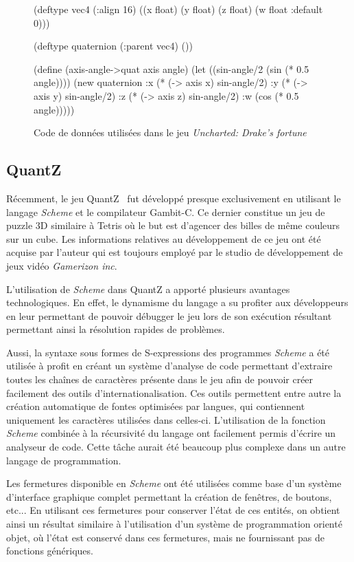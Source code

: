 \documentclass[12pt,twoside,letterpaper,francais]{book}
\newcommand{\Schemelang}{{\textit{Scheme }}}
\newcommand{\scheme}[1]{\selectlanguage{english}{\tt #1}\selectlanguage{french}}
\begin{document}
\begin{figure}[htb!]
  \begin{schemecode}
(deftype vec4 (:align 16)
  ((x float) (y float)
   (z float) (w float :default 0)))

(deftype quaternion (:parent vec4) ())

(define (axis-angle->quat axis angle)
 (let ((sin-angle/2 (sin (* 0.5 angle))))
  (new quaternion
       :x (* (-> axis x) sin-angle/2)
       :y (* (-> axis y) sin-angle/2)
       :z (* (-> axis z) sin-angle/2)
       :w (cos (* 0.5 angle)))))
  \end{schemecode}
  \caption{Code de données utilisées dans le jeu \textit{Uncharted:
      Drake's fortune}~\cite{ND_DRAKE}}
  \label{Rev:Drake}
\end{figure}


\FloatBarrier
\subsection{QuantZ}
Récemment, le jeu QuantZ~\cite{Quantz} fut développé presque
exclusivement en utilisant le langage \Schemelang et le compilateur
Gambit-C. Ce dernier constitue un jeu de puzzle 3D similaire à Tetris
où le but est d'agencer des billes de même couleurs sur un cube. Les
informations relatives au développement de ce jeu ont été acquise par
l'auteur qui est toujours employé par le studio de développement de
jeux vidéo \textit{Gamerizon inc}.

L'utilisation de \Schemelang dans QuantZ a apporté plusieurs avantages
technologiques. En effet, le dynamisme du langage a su profiter aux
développeurs en leur permettant de pouvoir débugger le jeu lors de son
exécution résultant permettant ainsi la résolution rapides de
problèmes.

Aussi, la syntaxe sous formes de S-expressions des programmes \Schemelang a
été utilisée à profit en créant un système d'analyse de code
permettant d'extraire toutes les chaînes de caractères présente dans
le jeu afin de pouvoir créer facilement des outils
d'internationalisation. Ces outils permettent entre autre la création
automatique de fontes optimisées par langues, qui contiennent
uniquement les caractères utilisées dans celles-ci. L'utilisation de
la fonction \Schemelang \scheme{read} combinée à la récursivité du langage
ont facilement permis d'écrire un analyseur de code. Cette tâche
aurait été beaucoup plus complexe dans un autre langage de
programmation.

Les fermetures disponible en \Schemelang ont été utilisées comme base d'un
système d'interface graphique complet permettant la création de
fenêtres, de boutons, etc... En utilisant ces fermetures pour
conserver l'état de ces entités, on obtient ainsi un résultat
similaire à l'utilisation d'un système de programmation orienté objet,
où l'état est conservé dans ces fermetures, mais ne fournissant pas de
fonctions génériques.
\end{document}
